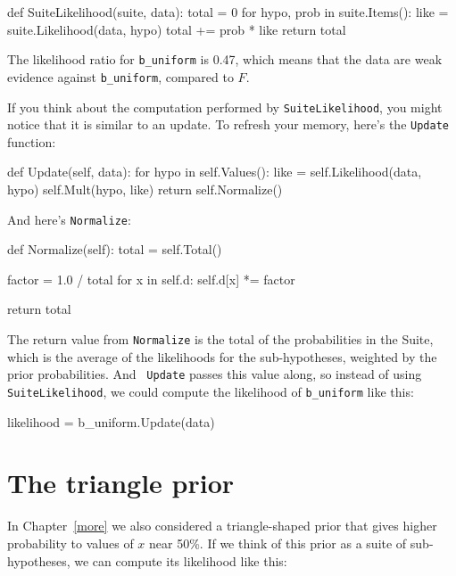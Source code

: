 \documentclass[12pt]{book}
\theoremstyle{exercise}
\begin{document}
\begin{code}
def SuiteLikelihood(suite, data):
    total = 0
    for hypo, prob in suite.Items():
        like = suite.Likelihood(data, hypo)
        total += prob * like
    return total
\end{code}

The likelihood ratio for \verb"b_uniform" is 0.47, which means
that the data are weak evidence against \verb"b_uniform",
compared to $F$.

If you think about the computation performed by
\verb"SuiteLikelihood", you might notice that it is similar to an
update.  To refresh your memory, here's the {\tt Update} function:

\begin{code}
    def Update(self, data):
        for hypo in self.Values():
            like = self.Likelihood(data, hypo)
            self.Mult(hypo, like)
        return self.Normalize()
\end{code}

And here's {\tt Normalize}:

\begin{code}
    def Normalize(self):
        total = self.Total()
        
        factor = 1.0 / total
        for x in self.d:
            self.d[x] *= factor

        return total
\end{code}

The return value from {\tt Normalize} is the total of the
probabilities in the Suite, which is the average of the likelihoods
for the sub-hypotheses, weighted by the prior probabilities.  And {\tt
  Update} passes this value along, so instead of using {\tt
  SuiteLikelihood}, we could compute the likelihood of
\verb"b_uniform" like this:

\begin{code}
    likelihood = b_uniform.Update(data)
\end{code}



\section{The triangle prior}

In Chapter~\ref{more} we also considered a triangle-shaped prior that
gives higher probability to values of $x$ near 50\%.  If we think of
this prior as a suite of sub-hypotheses, we can compute its likelihood
like this:
\end{document}
